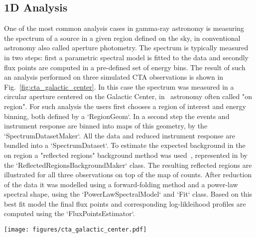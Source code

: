 \subsection{1D Analysis}
\label{ssec:1d-analysis}
One of the most common analysis cases in gamma-ray astronomy is measuring the
spectrum of a source in a given region defined on the sky, in conventional
astronomy also called aperture photometry.
The spectrum is typically measured in two steps: first a parametric
spectral model is fitted to the data and secondly flux points are computed
in a pre-defined set of energy bins.
The result of such an analysis performed on three simulated CTA observations
is shown in Fig.~\ref{fig:cta_galactic_center}.
In this case the spectrum was measured in a circular aperture centered
on the Galactic Center, in \gammaray~astronomy often called "on region".
For such analysis the users first chooses a region of interest
and energy binning, both defined by a `RegionGeom`.
In a second step the events and instrument response are binned into
maps of this geometry, by the `SpectrumDatasetMaker`.
All the data and reduced instrument response are bundled into a
`SpectrumDataset`.
To estimate the expected background in the on region a "reflected regions"
background method was used~\cite{Berge07}, represented in \gammapy
by the `ReflectedRegionsBackgroundMaker` class.
The resulting reflected regions are illustrated for all three observations
on top of the map of counts.
After reduction of the data it was modelled using a forward-folding
method and a power-law spectral shape, using the `PowerLawSpectralModel`
and `Fit` class.
Based on this best fit model the final flux points and
corresponding log-likleihood profiles are computed using
the `FluxPointsEstimator`.

\begin{figure*}[t]
	\centering
	\texttt{[image: figures/cta\_galactic\_center.pdf]}
	\caption{
        Example spectral analysis of the Galactic Center for three simulated CTA observations.
        The left image shows the maps of counts with the measurement region and background
        regions overlaid in different colors. The right image shows the resulting spectral
        points and their corresponding log-likelihood profiles.
    }
	\label{fig:cta_galactic_center}
\end{figure*}

